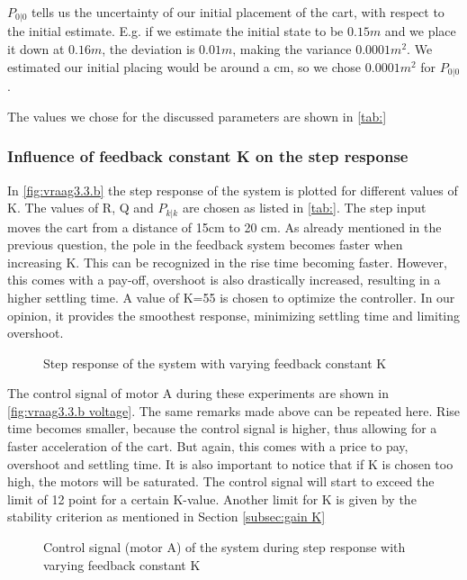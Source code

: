 \documentclass[a4paper]{article}
\newcommand{\newpar}{\vspace{.3cm}\noindent}
\begin{document}
\newpar
$P_{0|0}$ tells us the uncertainty of our initial placement of the cart, with respect to the initial estimate. E.g. if we estimate the initial state to be $0.15m$ and we place it down at $0.16m$, the deviation is $0.01m$, making the variance $0.0001m^2$. We estimated our initial placing would be around a cm, so we chose $0.0001m^2$ for $P_{0|0}$.

\newpar
The values we chose for the discussed parameters are shown in \autoref{tab:}


\subsubsection{Influence of feedback constant K on the step response}
In \autoref{fig:vraag3.3.b} the step response of the system is plotted for different values of K. The values of R, Q and $P_{k|k}$ are chosen as listed in \autoref{tab:}. The step input moves the cart from a distance of 15cm to 20 cm. As already mentioned in the previous question, the pole in the feedback system becomes faster when increasing K. This can be recognized in the rise time becoming faster. However, this comes with a pay-off, overshoot is also drastically increased, resulting in a higher settling time. A value of K=55 is chosen to optimize the controller. In our opinion, it provides the smoothest response, minimizing settling time and limiting overshoot.

\begin{figure}[H]
    \caption{Step response of the system with varying feedback constant K}
    \label{fig:vraag3.3.b}
\end{figure}

The control signal of motor A during these experiments are shown in \autoref{fig:vraag3.3.b voltage}. The same remarks made above can be repeated here. Rise time becomes smaller, because the control signal is higher, thus allowing for a faster acceleration of the cart. But again, this comes with a price to pay, overshoot and settling time. It is also important to notice that if K is chosen too high, the motors will be saturated. The control signal will start to exceed the limit of 12 point for a certain K-value. Another limit for K is given by the stability criterion as mentioned in Section \ref{subsec:gain K}

\begin{figure}[H]
    \caption{Control signal (motor A) of the system during step response with varying feedback constant K}
    \label{fig:vraag3.3.b voltage}
\end{figure}
\end{document}
